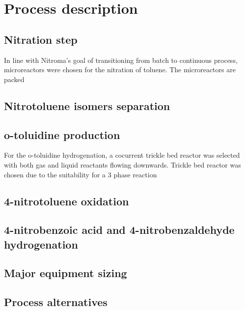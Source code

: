 \section{Process description}
\label{sec:process}
\subsection{Nitration step}
In line with Nitroma's goal of transitioning from batch to continuous process, microreactors were chosen for the nitration of toluene. The microreactors are packed 
\subsection{Nitrotoluene isomers separation}



\subsection{o-toluidine production}
For the o-toluidine hydrogenation, a cocurrent trickle bed reactor was selected
with both gas and liquid reactants flowing downwards. Trickle bed reactor was chosen 
due to the suitability for a 3 phase reaction 

\subsection{4-nitrotoluene oxidation}

\subsection{4-nitrobenzoic acid and 4-nitrobenzaldehyde hydrogenation}


\subsection{Major equipment sizing}


\subsection{Process alternatives}



